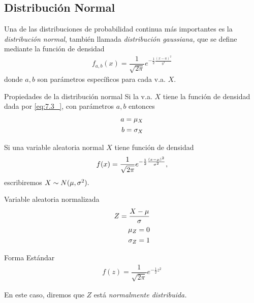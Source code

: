 \subsection{Distribución Normal}

 Una de las distribuciones de probabilidad continua más importantes es la \emph{distribución normal}, también llamada \emph{distribución gaussiana,} que se define mediante la función de densidad
 \begin{align}
  \label{eq:7.3_}
  f_{a,b}(x)=\dfrac{1}{\sqrt{2\pi}}e^{-\frac{1}{2}\frac{(x-a)^{2}}{b^{2}}}
 \end{align}
donde $a,b$ son parámetros específicos para cada v.a. $X.$

{Propiedades de la distribución normal}
 Si la v.a. $X$ tiene la función de densidad dada por \eqref{eq:7.3_}, con parámetros $a,b$ entonces
 \begin{align}
  a = \mu_{X}\\
  b = \sigma_{X}
 \end{align}



 Si una variable aleatoria normal $X$ tiene función de densidad
  \begin{align}
  \label{eq:7.3_}
  f(x)=\dfrac{1}{\sqrt{2\pi}}e^{-\frac{1}{2}\frac{(x-\mu)^{2}}{\sigma^{2}}},
 \end{align}
 escribiremos $X\sim N(\mu, \sigma^{2}).$


{Variable aleatoria normalizada}
 \begin{align}
  \label{van}
  Z = \dfrac{X-\mu}{\sigma}\\
  \mu_{Z}=0 \\
  \sigma_{Z}=1
 \end{align}


{Forma Estándar}
 \begin{align}
  \label{eq:7.4}
  f(z)=\dfrac{1}{\sqrt{2\pi}}e^{-\frac{1}{2}z^{2}}
 \end{align}


En este caso, diremos que $Z$ está \emph{normalmente distribuida.}


